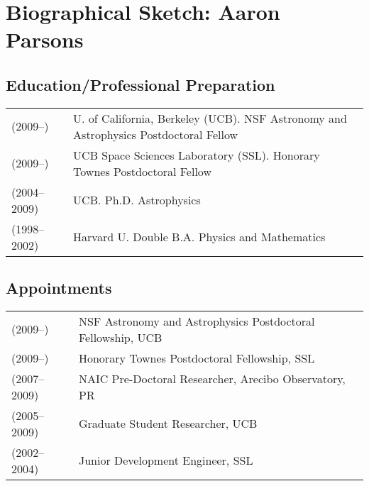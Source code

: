\documentclass[apjpt4]{aastex}
\begin{document}
\section*{\Large Biographical Sketch: Aaron Parsons}


\subsection*{Education/Professional Preparation}
\vspace{-8pt}


\begin{tabular}{ll}
(2009--\hfill)& U. of California, Berkeley (UCB).  NSF Astronomy and
Astrophysics Postdoctoral Fellow\\
(2009--\hfill)& UCB Space Sciences Laboratory (SSL).  Honorary Townes Postdoctoral Fellow\\
(2004--2009)& UCB.  Ph.D. Astrophysics\\
(1998--2002)& Harvard U.  Double B.A. Physics and Mathematics\\
\end{tabular}

\subsection*{Appointments}
\vspace{-8pt}


\begin{tabular}{ll}
\vspace{-2pt}
(2009--\hfill) &NSF Astronomy and Astrophysics Postdoctoral Fellowship, UCB\\
(2009--\hfill) &Honorary Townes Postdoctoral Fellowship, SSL\\
(2007--2009) &NAIC Pre-Doctoral Researcher, Arecibo Observatory, PR\\
(2005--2009)& Graduate Student Researcher,  UCB\\
(2002--2004)& Junior Development Engineer, SSL\\
\end{tabular}
\end{document}
